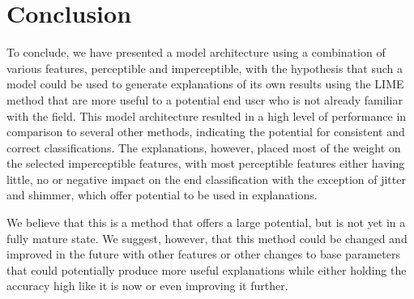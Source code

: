\documentclass{article}
\begin{document}
	\section{Conclusion}
	To conclude, we have presented a model architecture using a combination of various features,
	perceptible and imperceptible, with the hypothesis that such a model could be used to generate
	explanations of its own results using the LIME method that are more useful to a potential end
	user who is not already familiar with the field. This model architecture resulted in a high
	level of performance in comparison to several other methods, indicating the potential for
	consistent and correct classifications. The explanations, however, placed most of the weight
	on the selected imperceptible features, with most perceptible features either having little,
	no or negative impact on the end classification with the exception of jitter and shimmer,
	which offer potential to be used in explanations.
	\par
	We believe that this is a method that offers a large potential, but is not yet in a fully
	mature state. We suggest, however, that this method could be changed and improved in the
	future with other features or other changes to base parameters that could potentially produce
	more useful explanations while either holding the accuracy high like it is now or even
	improving it further.
	\newpage
	\sloppy
	\printbibliography
\end{document}
